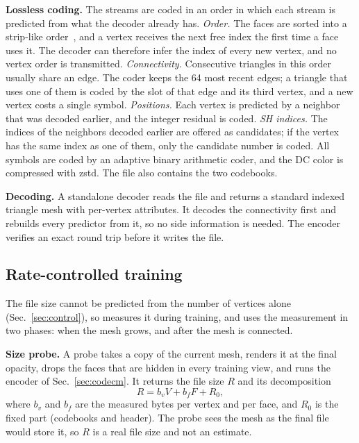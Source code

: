 \noindent\textbf{Lossless coding.} The streams are coded in an order in which each stream is predicted from what the decoder already has. \emph{Order.} The faces are sorted into a strip-like order~\cite{meshoptimizer}, and a vertex receives the next free index the first time a face uses it. The decoder can therefore infer the index of every new vertex, and no vertex order is transmitted. \emph{Connectivity.} Consecutive triangles in this order usually share an edge. The coder keeps the 64 most recent edges; a triangle that uses one of them is coded by the slot of that edge and its third vertex, and a new vertex costs a single symbol. \emph{Positions.} Each vertex is predicted by a neighbor that was decoded earlier, and the integer residual is coded. \emph{SH indices.} The indices of the neighbors decoded earlier are offered as candidates; if the vertex has the same index as one of them, only the candidate number is coded. All symbols are coded by an adaptive binary arithmetic coder, and the DC color is compressed with zstd. The file also contains the two codebooks.

\noindent\textbf{Decoding.} A standalone decoder reads the file and returns a standard indexed triangle mesh with per-vertex attributes. It decodes the connectivity first and rebuilds every predictor from it, so no side information is needed. The encoder verifies an exact round trip before it writes the file.

\subsection{Rate-controlled training}
\label{sec:rc}
The file size cannot be predicted from the number of vertices alone (Sec.~\ref{sec:control}), so \BM measures it during training, and uses the measurement in two phases: when the mesh grows, and after the mesh is connected.

\noindent\textbf{Size probe.} A probe takes a copy of the current mesh, renders it at the final opacity, drops the faces that are hidden in every training view, and runs the encoder of Sec.~\ref{sec:codecm}. It returns the file size $R$ and its decomposition
\begin{equation}
R = b_v V + b_f F + R_0 ,
\label{eq:bytes}
\end{equation}
where $b_v$ and $b_f$ are the measured bytes per vertex and per face, and $R_0$ is the fixed part (codebooks and header). The probe sees the mesh as the final file would store it, so $R$ is a real file size and not an estimate.

